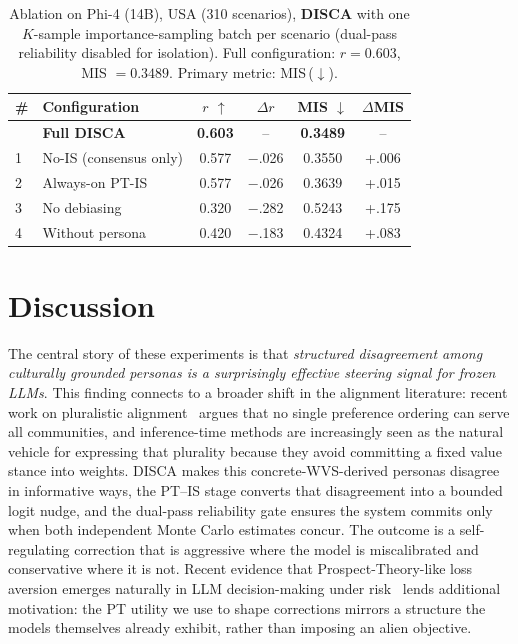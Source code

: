 \documentclass{article}
\newcommand{\loss}[1]{\textcolor{worsered}{#1}}
\begin{document}
\begin{table}[t]
\caption{Ablation on Phi-4 (14B), USA (310 scenarios), \textbf{DISCA} with one
$K$-sample importance-sampling batch per scenario (dual-pass reliability disabled for isolation).
Full configuration: $r = 0.603$, MIS $= 0.3489$. Primary metric: MIS\,($\downarrow$).}
\label{tab:ablation_phi4}
\centering\small
\setlength{\tabcolsep}{4pt}
\begin{tabular}{llcccc}
\toprule
\# & Configuration & $r$ $\uparrow$ & $\Delta r$ & MIS $\downarrow$ & $\Delta$MIS \\
\midrule
  & \textbf{Full DISCA} & \textbf{0.603} & -- & \textbf{0.3489} & -- \\
\midrule
1 & No-IS (consensus only)  & 0.577 & \loss{$-$.026} & 0.3550 & \loss{+.006} \\
2 & Always-on PT-IS         & 0.577 & \loss{$-$.026} & 0.3639 & \loss{+.015} \\
3 & No debiasing            & 0.320 & \loss{$-$.282} & 0.5243 & \loss{+.175} \\
4 & Without persona         & 0.420 & \loss{$-$.183} & 0.4324 & \loss{+.083} \\
\bottomrule
\end{tabular}
\end{table}

\section{Discussion}
\label{sec:discussion}

The central story of these experiments is that \emph{structured disagreement among culturally grounded personas is a surprisingly effective steering signal for frozen LLMs}. This finding connects to a broader shift in the alignment literature: recent work on pluralistic alignment~\citep{sorensen2024roadmap} argues that no single preference ordering can serve all communities, and inference-time methods are increasingly seen as the natural vehicle for expressing that plurality because they avoid committing a fixed value stance into weights. DISCA makes this concrete-WVS-derived personas disagree in informative ways, the PT--IS stage converts that disagreement into a bounded logit nudge, and the dual-pass reliability gate ensures the system commits only when both independent Monte Carlo estimates concur. The outcome is a self-regulating correction that is aggressive where the model is miscalibrated and conservative where it is not. Recent evidence that Prospect-Theory-like loss aversion emerges naturally in LLM decision-making under risk~\citep{payne2025prospect} lends additional motivation: the PT utility we use to shape corrections mirrors a structure the models themselves already exhibit, rather than imposing an alien objective.
\end{document}

